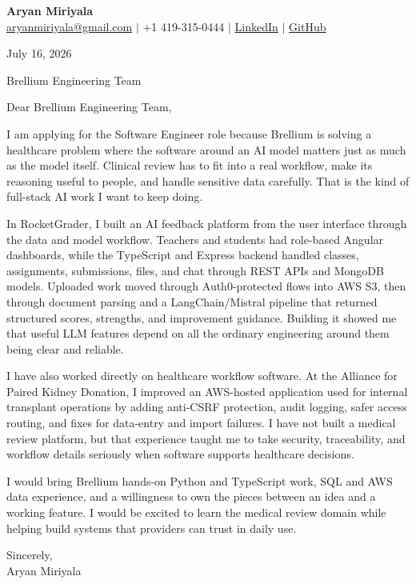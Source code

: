 \documentclass[letterpaper,11pt]{article}
\begin{document}
{\Large\textbf{Aryan Miriyala}}\\
\href{mailto:aryanmiriyala@gmail.com}{aryanmiriyala@gmail.com} $|$ +1 419-315-0444 $|$
\href{https://www.linkedin.com/in/aryan-miriyala-7788a21b6/}{LinkedIn} $|$
\href{https://github.com/aryanmiriyala}{GitHub}

July 16, 2026

Brellium Engineering Team

Dear Brellium Engineering Team,

I am applying for the Software Engineer role because Brellium is solving a healthcare problem where the software around an AI model matters just as much as the model itself. Clinical review has to fit into a real workflow, make its reasoning useful to people, and handle sensitive data carefully. That is the kind of full-stack AI work I want to keep doing.

In RocketGrader, I built an AI feedback platform from the user interface through the data and model workflow. Teachers and students had role-based Angular dashboards, while the TypeScript and Express backend handled classes, assignments, submissions, files, and chat through REST APIs and MongoDB models. Uploaded work moved through Auth0-protected flows into AWS S3, then through document parsing and a LangChain/Mistral pipeline that returned structured scores, strengths, and improvement guidance. Building it showed me that useful LLM features depend on all the ordinary engineering around them being clear and reliable.

I have also worked directly on healthcare workflow software. At the Alliance for Paired Kidney Donation, I improved an AWS-hosted application used for internal transplant operations by adding anti-CSRF protection, audit logging, safer access routing, and fixes for data-entry and import failures. I have not built a medical review platform, but that experience taught me to take security, traceability, and workflow details seriously when software supports healthcare decisions.

I would bring Brellium hands-on Python and TypeScript work, SQL and AWS data experience, and a willingness to own the pieces between an idea and a working feature. I would be excited to learn the medical review domain while helping build systems that providers can trust in daily use.

Sincerely,\\
Aryan Miriyala
\end{document}
